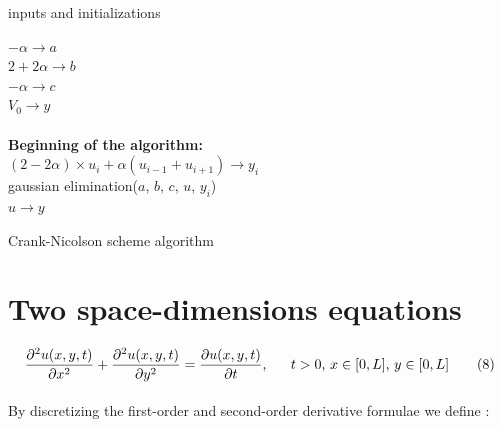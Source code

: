 \documentclass[a4paper, twoside, 11pt]{report}
\theoremstyle{theorem}
\theoremstyle{remark}
\theoremstyle{exemple}
\begin{document}
                    \begin{center}
                    \begin{algorithm}[H]

                    \SetAlgoLined

                    inputs and initializations

                    $-\alpha \rightarrow a$\\
                    $2+2\alpha \rightarrow b$\\
                    $-\alpha \rightarrow c$\\
                    $V_0 \rightarrow y$\\
                    \ \\

                    \textbf{Beginning of the algorithm:} \\
                        {
                            {
                                $(2 - 2 \alpha) \times u_i + \alpha (u_{i-1}+u_{i+1}) \rightarrow y_i$ \\
                            }
                            gaussian elimination($a$, $b$, $c$, $u$, $y_i$)\\
                            $u\rightarrow y$ \\
                        }
                    \caption{Crank-Nicolson scheme algorithm}
                    \end{algorithm}
                    \end{center}

    \section{Two space-dimensions equations}

            \begin{equation*}
                    \frac{\partial^2u(x,y,t)}{\partial x^2}+\frac{\partial^2u(x,y,t)}    {\partial y^2}=\frac{\partial u(x,y,t)}{\partial t}\text{, \hspace{0.5cm}$t>0$, $x\in[0,L]$, $y\in [0,L]$}
                    \tag{8}
                \end{equation*}

            \paragraph{}By discretizing the first-order and second-order derivative formulae we define :
\end{document}
